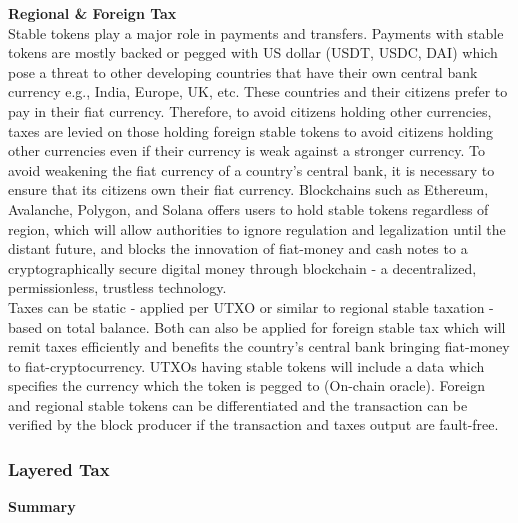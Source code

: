 \documentclass[letterpaper,11pt]{article}
\begin{document}
\textbf{Regional \& Foreign Tax}\\

Stable tokens play a major role in payments and transfers. Payments with stable tokens are mostly backed or pegged with US dollar (USDT, USDC, DAI) which pose a threat to other developing countries that have their own central bank currency e.g., India, Europe, UK, etc. These countries and their citizens prefer to pay in their fiat currency. Therefore, to avoid citizens holding other currencies, taxes are levied on those holding foreign stable tokens to avoid citizens holding other currencies even if their currency is weak against a stronger currency. To avoid weakening the fiat currency of a country's central bank, it is necessary to ensure that its citizens own their fiat currency. Blockchains such as Ethereum, Avalanche, Polygon, and Solana offers users to hold stable tokens regardless of region, which will allow authorities to ignore regulation and legalization until the distant future, and blocks the innovation of fiat-money and cash notes to a cryptographically secure digital money through blockchain - a decentralized, permissionless, trustless technology.\\

Taxes can be static - applied per UTXO or similar to regional stable taxation - based on total balance. Both can also be applied for foreign stable tax which will remit taxes efficiently and benefits the country's central bank bringing fiat-money to fiat-cryptocurrency. UTXOs having stable tokens will include a data which specifies the currency which the token is pegged to (On-chain oracle). Foreign and regional stable tokens can be differentiated and the transaction can be verified by the block producer if the transaction and taxes output are fault-free.\\

\subsubsection{Layered Tax}

\textbf{Summary}\\
\end{document}
